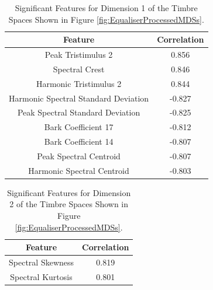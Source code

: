 		\begin{table}[h!]
			\centering
			\begin{tabular}{|c|c|}
				\hline
				\bf{Feature} & \bf{Correlation} \\
				\hline
				\hline
				Peak Tristimulus 2 &  0.856 \\
				\hline
				Spectral Crest &  0.846 \\
				\hline
				Harmonic Tristimulus 2 &  0.844 \\
				\hline
				Harmonic Spectral Standard Deviation & -0.827 \\
				\hline
				Peak Spectral Standard Deviation & -0.825 \\
				\hline
				Bark Coefficient 17 & -0.812 \\
				\hline
				Bark Coefficient 14 & -0.807 \\
				\hline
				Peak Spectral Centroid & -0.807 \\
				\hline
				Harmonic Spectral Centroid & -0.803 \\
				\hline
			\end{tabular}
			\caption{Significant Features for Dimension 1 of the Timbre Spaces Shown in Figure 
				 \ref{fig:EqualiserProcessedMDSs}.}
			\label{tab:EqualiserProcessedFeaturesDim1}
		\end{table}

		\begin{table}[h!]
			\centering
			\begin{tabular}{|c|c|}
				\hline
				\bf{Feature} & \bf{Correlation} \\
				\hline
				\hline
				Spectral Skewness & 0.819 \\
				\hline
				Spectral Kurtosis & 0.801 \\
				\hline
			\end{tabular}
			\caption{Significant Features for Dimension 2 of the Timbre Spaces Shown in Figure 
				 \ref{fig:EqualiserProcessedMDSs}.}
			\label{tab:EqualiserProcessedFeaturesDim2}
		\end{table}


